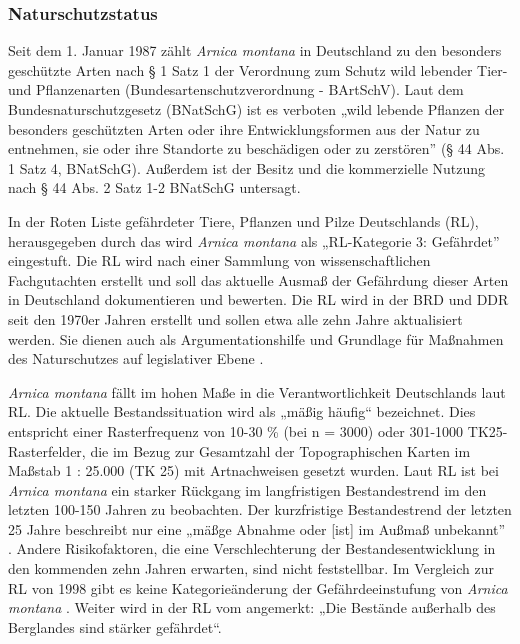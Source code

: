 \subsubsection{Naturschutzstatus}

Seit dem 1. Januar 1987	zählt \textit{Arnica montana} in Deutschland zu den besonders geschützte Arten nach § 1 Satz 1 der Verordnung zum Schutz wild lebender Tier- und Pflanzenarten (Bundesartenschutzverordnung - BArtSchV). Laut dem Bundesnaturschutzgesetz (BNatSchG) ist es verboten „wild lebende Pflanzen der besonders geschützten Arten oder ihre Entwicklungsformen aus der Natur zu entnehmen, sie oder ihre Standorte zu beschädigen oder zu zerstören” (§ 44 Abs. 1 Satz 4, BNatSchG). Außerdem ist der Besitz und die kommerzielle Nutzung nach § 44 Abs. 2 Satz 1-2 BNatSchG untersagt.

In der Roten Liste gefährdeter Tiere, Pflanzen und Pilze Deutschlands (RL), herausgegeben durch das \citet[S. 36]{RL2018} wird \textit{Arnica montana} als „RL-Kategorie 3: Gefährdet” eingestuft. Die RL wird nach einer Sammlung von wissenschaftlichen Fachgutachten erstellt und soll das aktuelle Ausmaß der Gefährdung dieser Arten in Deutschland dokumentieren und bewerten. Die RL wird in der BRD und DDR seit den 1970er Jahren erstellt und sollen etwa alle zehn Jahre aktualisiert werden. Sie dienen  auch als Argumentationshilfe und Grundlage für Maßnahmen des Naturschutzes auf legislativer Ebene \citep[vgl.][]{RL2009}. %

\textit{Arnica montana} fällt im hohen Maße in die Verantwortlichkeit Deutschlands laut RL. Die aktuelle Bestandssituation wird als „mäßig häufig“ bezeichnet. Dies entspricht einer Rasterfrequenz von 10-30 \% (bei n = 3000) oder 301-1000 TK25-Rasterfelder, die im Bezug zur Gesamtzahl der Topographischen Karten im Maßstab 1 : 25.000 (TK 25) mit Artnachweisen gesetzt wurden. Laut RL ist bei \textit{Arnica montana} ein starker Rückgang im langfristigen Bestandestrend im den letzten 100-150 Jahren zu beobachten. Der kurzfristige Bestandestrend der letzten 25 Jahre beschreibt nur eine „mäßge Abnahme oder [ist] im Außmaß unbekannt” \citep[S. 36]{RL2018}. Andere Risikofaktoren, die eine Verschlechterung der Bestandesentwicklung in den kommenden zehn Jahren erwarten, sind nicht feststellbar. Im Vergleich zur RL von 1998 gibt es keine Kategorieänderung der Gefährdeeinstufung von \textit{Arnica montana} \citep[vgl.][S. 36]{RL2018}. Weiter wird in der RL vom \citet[S. 148]{RL2018} angemerkt: „Die Bestände außerhalb des Berglandes sind stärker gefährdet“. %

